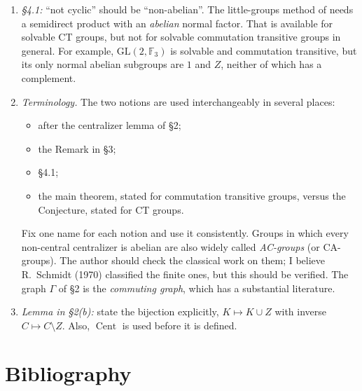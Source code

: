 \documentclass[12pt,letterpaper]{article}
\newcommand{\F}{\mathbb{F}}
\newcommand{\Cent}{\operatorname{Cent}}
\newcommand{\PSL}{\mathrm{PSL}}
\newcommand{\GL}{\mathrm{GL}}
\theoremstyle{definition}
\begin{document}
\begin{enumerate}[leftmargin=*,itemsep=2pt]
\begin{itemize}[itemsep=0pt]
    nontrivial fixed points; that is, $G$ is a Frobenius group with
    abelian kernel and cyclic complement.
  \item The paper treats a ``general case'', so it should also state the
    nonsolvable case: as I understand the literature (Suzuki;
    Brauer--Suzuki--Wall; Wu), a finite nonsolvable CT group is
    isomorphic to $\PSL(2,\F_{2^k})$, $k\ge2$. The author should confirm
    the exact statement in \cite{Wu}. With it, \S4.2 reduces to two
    explicit families, which would make the paper much more concrete.
  \end{itemize}
\item \emph{\S4.1:} ``not cyclic'' should be ``non-abelian''. The
  little-groups method of \cite[\S8.2]{Se} needs a semidirect product
  with an \emph{abelian} normal factor. That is available for solvable
  CT groups, but not for solvable commutation transitive groups in
  general. For example, $\GL(2,\F_3)$ is solvable and commutation
  transitive, but its only normal abelian subgroups are $1$ and $Z$,
  neither of which has a complement.
\item \emph{Terminology.} The two notions are used interchangeably in
  several places:
  \begin{itemize}[itemsep=0pt]
  \item after the centralizer lemma of \S2;
  \item the Remark in \S3;
  \item \S4.1;
  \item the main theorem, stated for commutation transitive groups,
    versus the Conjecture, stated for CT groups.
  \end{itemize}
  Fix one name for each notion and use it consistently. Groups in which
  every non-central centralizer is abelian are also widely called
  \emph{AC-groups} (or CA-groups). The author should check the classical
  work on them; I believe R.~Schmidt (1970) classified the finite ones,
  but this should be verified. The graph $\Gamma$ of \S2 is the
  \emph{commuting graph}, which has a substantial literature.
\item \emph{Lemma in \S2(b):} state the bijection explicitly, $K\mapsto
  K\cup Z$ with inverse $C\mapsto C\setminus Z$. Also, $\Cent$ is used
  before it is defined.
\end{enumerate}

\section{Bibliography}
\end{document}
